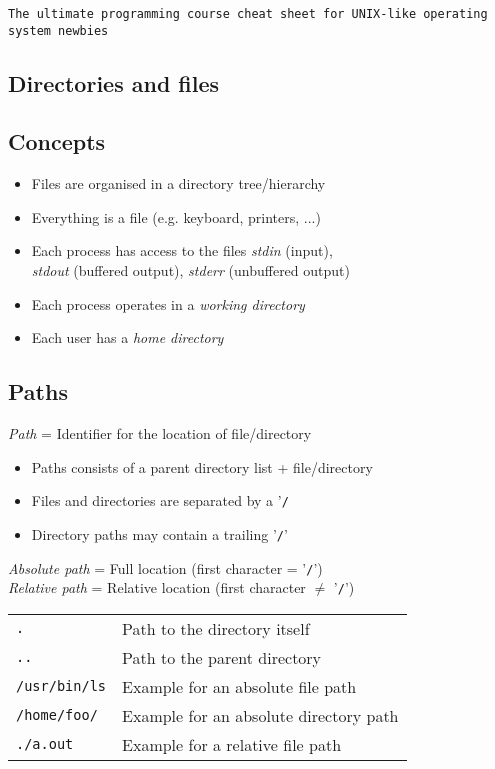 \documentclass[landscape, a4paper]{article}
\newcommand{\cl}[1]{\texttt{#1}}
\begin{document}
\begin{center}
    \cl{The ultimate programming course cheat sheet for UNIX-like operating system newbies}
\end{center}
\begin{multicols*}{3}
\section*{\centering Directories and files}
\subsection*{Concepts}
\begin{itemize}
    \item Files are organised in a directory tree/hierarchy
    \item Everything is a file (e.g. keyboard, printers, ...)
    \item Each process has access to the files \textit{stdin} (input),\\
          \textit{stdout} (buffered output), \textit{stderr} (unbuffered output)
    \item Each process operates in a \textit{working directory}
    \item Each user has a \textit{home directory}
\end{itemize}
\subsection*{Paths}
\textit{Path} = Identifier for the location of file/directory
\begin{itemize}
    \item Paths consists of a parent directory list + file/directory
    \item Files and directories are separated by a '\cl{/}
    \item Directory paths may contain a trailing '\cl{/}'
\end{itemize}
\textit{Absolute path} = Full location (first character = '\cl{/}')\\
\textit{Relative path} = Relative location (first character $\neq$ '\cl{/}')
\begin{tabular}{ll}
\cl{.}              & Path to the directory itself\\
\cl{..}             & Path to the parent directory\\
\cl{/usr/bin/ls}    & Example for an absolute file path\\
\cl{/home/foo/}     & Example for an absolute directory path\\
\cl{./a.out}        & Example for a relative file path\\
\end{tabular}

\end{multicols*}
\end{document}
